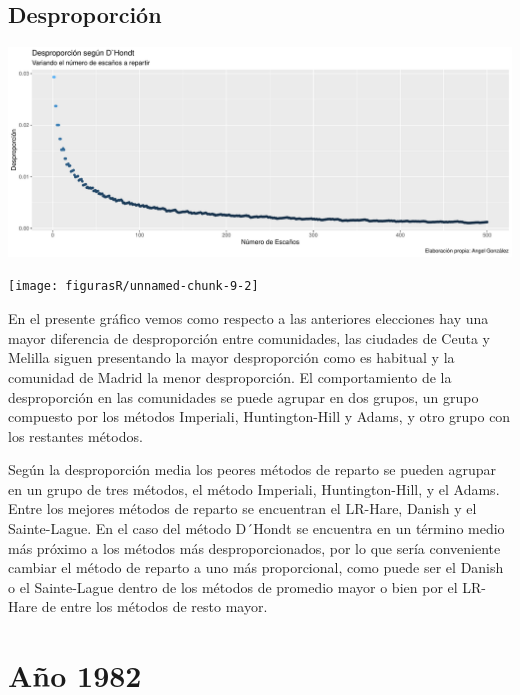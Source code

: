 \documentclass[12pt,a4paper,]{book}
\numberwithin{dummy}{section}
\theoremstyle{ocrenumbox}
\theoremstyle{blacknumex}
\theoremstyle{blacknumbox}
\theoremstyle{ocrenum}
\theoremstyle{ocrenum}
\begin{document}
\hypertarget{desproporciuxf3n-1}{%
\subsection{Desproporción}\label{desproporciuxf3n-1}}

\begin{center}\includegraphics[width=1\linewidth]{figurasR/unnamed-chunk-9-1} \end{center}

\begin{center}\texttt{[image: figurasR/unnamed-chunk-9-2]} \end{center}

En el presente gráfico vemos como respecto a las anteriores elecciones
hay una mayor diferencia de desproporción entre comunidades, las
ciudades de Ceuta y Melilla siguen presentando la mayor desproporción
como es habitual y la comunidad de Madrid la menor desproporción. El
comportamiento de la desproporción en las comunidades se puede agrupar
en dos grupos, un grupo compuesto por los métodos Imperiali,
Huntington-Hill y Adams, y otro grupo con los restantes métodos.

Según la desproporción media los peores métodos de reparto se pueden
agrupar en un grupo de tres métodos, el método Imperiali,
Huntington-Hill, y el Adams. Entre los mejores métodos de reparto se
encuentran el LR-Hare, Danish y el Sainte-Lague. En el caso del método
D´Hondt se encuentra en un término medio más próximo a los métodos más
desproporcionados, por lo que sería conveniente cambiar el método de
reparto a uno más proporcional, como puede ser el Danish o el
Sainte-Lague dentro de los métodos de promedio mayor o bien por el
LR-Hare de entre los métodos de resto mayor.

\hypertarget{auxf1o-1982}{%
\section{Año 1982}\label{auxf1o-1982}}
\end{document}
